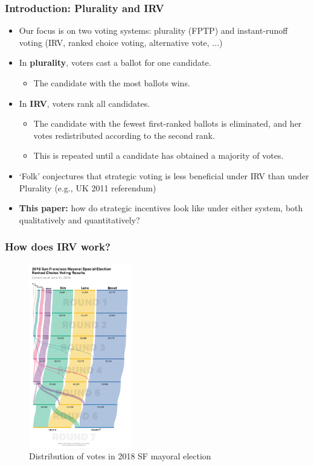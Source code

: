\documentclass[10pt, en-GB]{beamer}
\begin{document}
\begin{frame}[t]\frametitle{Introduction: Plurality and IRV}
    \begin{itemize}[<+->]
    \item Our focus is on two voting systems: plurality (FPTP) and instant-runoff voting (IRV, ranked choice voting, alternative vote, ...)
    \item In \textbf{plurality}, voters cast a ballot for one candidate.
    \begin{itemize}
    	\item The candidate with the most ballots wins.
    \end{itemize}
    \item In \textbf{IRV}, voters rank all candidates. 
    \begin{itemize}
    	\item The candidate with the fewest first-ranked ballots is eliminated, and her votes redistributed according to the second rank.
    	\item This is repeated until a candidate has obtained a majority of votes.
    \end{itemize}
    \item `Folk' conjectures that strategic voting is less beneficial under IRV than under Plurality (e.g., UK 2011 referendum)
    \item \textbf{This paper:} how do strategic incentives look like under either system, both qualitatively and quantitatively?
    \end{itemize}
    \hyperlink{strat_qual}{}
\end{frame}

\begin{frame}[t]\frametitle{How does IRV work?}
\begin{figure}[tb]
	\centering
	\includegraphics[width = 0.4\textwidth]{pres_fig/sf_election}
	\caption{Distribution of votes in 2018 SF mayoral election}
	\label{fig:sf}
\end{figure}
\end{frame}
\end{document}
